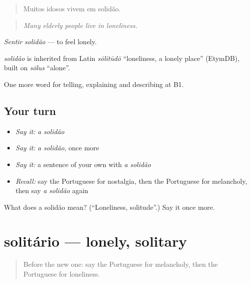 \begin{quote}
Muitos idosos vivem em solidão.
\end{quote}

\begin{quote}
\emph{Many elderly people live in loneliness.}
\end{quote}

\emph{Sentir solidão} — to feel lonely.

\begin{cousinweb}
\emph{solidão} is inherited from Latin \emph{sōlitūdō} \textquotedblleft{}loneliness, a lonely place\textquotedblright{} (EtymDB), built on \emph{sōlus} \textquotedblleft{}alone\textquotedblright{}.
\end{cousinweb}

\begin{grammarlens}[title={What you've built}]
One more word for telling, explaining and describing at B1.
\end{grammarlens}

\subsection*{Your turn}
\begin{itemize}
\raggedright
  \item \emph{Say it:} \emph{a solidão}
  \item \emph{Say it:} \emph{a solidão}, once more
  \item \emph{Say it:} a sentence of your own with \emph{a solidão}
  \item \emph{Recall:} say the Portuguese for nostalgia, then the Portuguese for melancholy, then say \emph{a solidão} again
\end{itemize}

\begin{tcolorbox}[breakable,colback=teal!4,colframe=teal!35!black,title={Before you move on}]
What does a solidão mean? (\textquotedblleft{}Loneliness, solitude\textquotedblright{}.) Say it once more.
\end{tcolorbox}
\section[solitário]{solitário — lonely, solitary}

\label{lesson:PT-C478-solitario}



\begin{quote}
Before the new one: say the Portuguese for melancholy, then the Portuguese for loneliness.
\end{quote}


